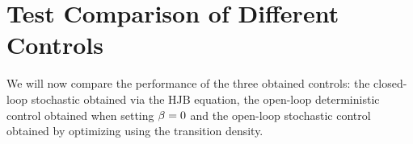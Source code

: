 \documentclass{article}
\begin{document}
% 


\section{Test Comparison of Different Controls}
\label{sec:probabilistic_numerical_test}
We will now compare the performance of the three obtained controls: the
closed-loop stochastic obtained via the HJB equation, the open-loop
deterministic control obtained when setting ${\beta}=0$ and the open-loop stochastic
control obtained by optimizing using the transition density.
\end{document}

